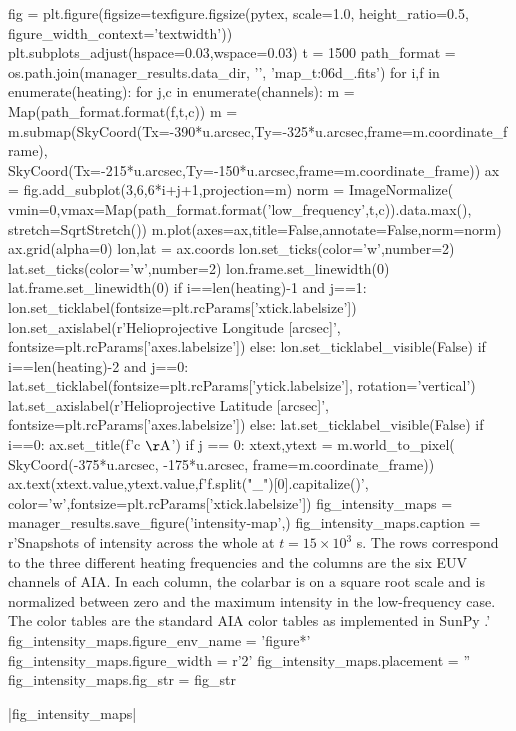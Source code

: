 \begin{pycode}
fig = plt.figure(figsize=texfigure.figsize(pytex, scale=1.0, height_ratio=0.5, 
                                           figure_width_context='textwidth'))
plt.subplots_adjust(hspace=0.03,wspace=0.03)
t = 1500
path_format = os.path.join(manager_results.data_dir, '{}', 'map_t{:06d}_{}.fits')
for i,f in enumerate(heating):
    for j,c in enumerate(channels):
        m = Map(path_format.format(f,t,c))
        m = m.submap(SkyCoord(Tx=-390*u.arcsec,Ty=-325*u.arcsec,frame=m.coordinate_frame),
                     SkyCoord(Tx=-215*u.arcsec,Ty=-150*u.arcsec,frame=m.coordinate_frame))
        ax = fig.add_subplot(3,6,6*i+j+1,projection=m)
        norm = ImageNormalize(
            vmin=0,vmax=Map(path_format.format('low_frequency',t,c)).data.max(),
            stretch=SqrtStretch())
        m.plot(axes=ax,title=False,annotate=False,norm=norm)
        ax.grid(alpha=0)
        lon,lat = ax.coords
        lon.set_ticks(color='w',number=2)
        lat.set_ticks(color='w',number=2)
        lon.frame.set_linewidth(0)
        lat.frame.set_linewidth(0)
        if i==len(heating)-1 and j==1:
            lon.set_ticklabel(fontsize=plt.rcParams['xtick.labelsize'])
            lon.set_axislabel(r'Helioprojective Longitude [arcsec]',
                                fontsize=plt.rcParams['axes.labelsize'])
        else:
            lon.set_ticklabel_visible(False)
        if i==len(heating)-2 and j==0:
            lat.set_ticklabel(fontsize=plt.rcParams['ytick.labelsize'], rotation='vertical')
            lat.set_axislabel(r'Helioprojective Latitude [arcsec]',
                                fontsize=plt.rcParams['axes.labelsize'])
        else:
            lat.set_ticklabel_visible(False)
        if i==0:
            ax.set_title(f'{c} $\mathrm{{\AA}}$')
        if j == 0:
            xtext,ytext = m.world_to_pixel(
                SkyCoord(-375*u.arcsec, -175*u.arcsec, frame=m.coordinate_frame))
            ax.text(xtext.value,ytext.value,f'{f.split("_")[0].capitalize()}',
                    color='w',fontsize=plt.rcParams['xtick.labelsize'])
fig_intensity_maps = manager_results.save_figure('intensity-map',)
fig_intensity_maps.caption = r'Snapshots of intensity across the whole \AR{} at $t=15\times10^3$ s. The rows correspond to the three different heating frequencies and the columns are the six EUV channels of AIA. In each column, the colarbar is on a square root scale and is normalized between zero and the maximum intensity in the low-frequency case. The color tables are the standard AIA color tables as implemented in SunPy \citep{sunpy_community_sunpypython_2015}.'
fig_intensity_maps.figure_env_name = 'figure*'
fig_intensity_maps.figure_width = r'2\columnwidth'
fig_intensity_maps.placement = ''
fig_intensity_maps.fig_str = fig_str
\end{pycode}
|fig_intensity_maps|

